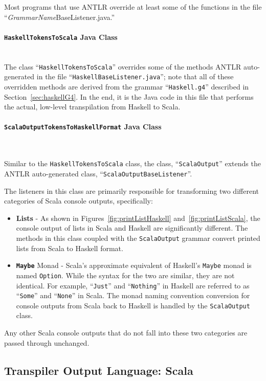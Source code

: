 \documentclass{report}
\newcommand{\myparagraph}[1]{\paragraph{#1}\mbox{}\\}
\begin{document}
Most programs that use ANTLR override at least some of the functions in the file ``\emph{GrammarName}BaseListener.java.''


\myparagraph{\texttt{HaskellTokensToScala} Java Class}

The class ``\texttt{HaskellTokensToScala}'' overrides some of the methods ANTLR auto-generated in the file ``\texttt{HaskellBaseListener.java}''; note that all of these overridden methods are derived from the grammar ``\texttt{Haskell.g4}'' described in Section~\ref{sec:haskellG4}.  In the end, it is the Java code in this file that performs the actual, low-level transpilation from Haskell to Scala.

\myparagraph{\texttt{ScalaOutputTokensToHaskellFormat} Java Class}\label{sec:scalaOutputFunctionality}

Similar to the \texttt{HaskellTokensToScala} class, the class, ``\texttt{ScalaOutput}'' extends the ANTLR auto-generated class, ``\texttt{ScalaOutputBaseListener}''.

The listeners in this class are primarily responsible for transforming two different categories of Scala console outputs, specifically:

\begin{itemize}

\item \textbf{Lists} - As shown in Figures~\ref{fig:printListHaskell} and~\ref{fig:printListScala}, the console output of lists in Scala and Haskell are significantly different.  The methods in this class coupled with the \texttt{ScalaOutput} grammar convert printed lists from Scala to Haskell format.

\item \textbf{\texttt{Maybe}} Monad - Scala's approximate equivalent of Haskell's \texttt{Maybe} monad is named \texttt{Option}.  While the syntax for the two are similar, they are not identical.  For example, ``\texttt{Just}'' and ``\texttt{Nothing}'' in Haskell are referred to as ``\texttt{Some}'' and ``\texttt{None}'' in Scala.  The monad naming convention conversion for console outputs from Scala back to Haskell is handled by the \texttt{ScalaOutput} class.

\end{itemize}

Any other Scala console outputs that do not fall into these two categories are passed through unchanged.


\subsection{Transpiler Output Language: Scala}
\end{document}
